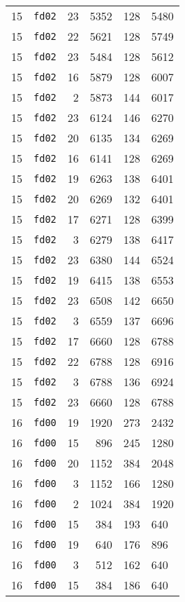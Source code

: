 \documentclass{article}
\begin{document}
\begin{table}[h!]
\begin{tabular}{llrrrl}
    15 & \texttt{fd02} & 23 & 5352 & 128 & 5480 \\
    15 & \texttt{fd02} & 22 & 5621 & 128 & 5749 \\
    15 & \texttt{fd02} & 23 & 5484 & 128 & 5612 \\
    15 & \texttt{fd02} & 16 & 5879 & 128 & 6007 \\
    15 & \texttt{fd02} & 2 & 5873 & 144 & 6017 \\
    15 & \texttt{fd02} & 23 & 6124 & 146 & 6270 \\
    15 & \texttt{fd02} & 20 & 6135 & 134 & 6269 \\
    15 & \texttt{fd02} & 16 & 6141 & 128 & 6269 \\
    15 & \texttt{fd02} & 19 & 6263 & 138 & 6401 \\
    15 & \texttt{fd02} & 20 & 6269 & 132 & 6401 \\
    15 & \texttt{fd02} & 17 & 6271 & 128 & 6399 \\
    15 & \texttt{fd02} & 3 & 6279 & 138 & 6417 \\
    15 & \texttt{fd02} & 23 & 6380 & 144 & 6524 \\
    15 & \texttt{fd02} & 19 & 6415 & 138 & 6553 \\
    15 & \texttt{fd02} & 23 & 6508 & 142 & 6650 \\
    15 & \texttt{fd02} & 3 & 6559 & 137 & 6696 \\
    15 & \texttt{fd02} & 17 & 6660 & 128 & 6788 \\
    15 & \texttt{fd02} & 22 & 6788 & 128 & 6916 \\
    15 & \texttt{fd02} & 3 & 6788 & 136 & 6924 \\
    15 & \texttt{fd02} & 23 & 6660 & 128 & 6788 \\
    16 & \texttt{fd00} & 19 & 1920 & 273 & 2432 \\
    16 & \texttt{fd00} & 15 & 896 & 245 & 1280 \\
    16 & \texttt{fd00} & 20 & 1152 & 384 & 2048 \\
    16 & \texttt{fd00} & 3 & 1152 & 166 & 1280 \\
    16 & \texttt{fd00} & 2 & 1024 & 384 & 1920 \\
    16 & \texttt{fd00} & 15 & 384 & 193 & 640 \\
    16 & \texttt{fd00} & 19 & 640 & 176 & 896 \\
    16 & \texttt{fd00} & 3 & 512 & 162 & 640 \\
    16 & \texttt{fd00} & 15 & 384 & 186 & 640 \\

\end{tabular}
\end{table}
\end{document}
